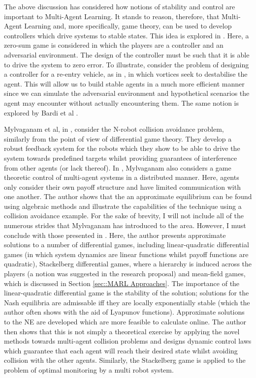 \documentclass[preprint,11pt]{report}
\begin{document}
The above discussion has considered how notions of stability and control are important to
Multi-Agent Learning. It stands to reason, therefore, that Multi-Agent Learning and, more
specifically, game theory, can be used to develop controllers which drive systems to stable states.
This idea is explored in \cite{Marden2018AnnualControl}. Here, a zero-sum game is considered in
which the players are a controller and an adversarial environment. The design of the controller must
be such that it is able to drive the system to zero error. To illustrate, consider the problem of
designing a controller for a re-entry vehicle, as in \cite{Breitner1994ReentryGame}, in which
vortices seek to destabilise the agent. This will allow us to build stable agents in a much more
efficient manner since we can simulate the adversarial environment and hypothetical scenarios the
agent may encounter without actually encountering them. The same notion is explored by Bardi et al
\cite{Bardi1991DifferentialDisturbances}.

 Mylvaganam et al, in \cite{Mylvaganam2017AutonomousApproach}, consider the N-robot collision
 avoidance problem, similarly from the point of view of differential game theory. They develop a
 robust feedback system for the robots which they show to be able to drive the system towards
 predefined targets whilst providing guarantees of interference from other agents (or lack thereof).
 In \cite{MylvaganamASystems}, Mylvaganam also considers a game theoretic control of multi-agent
 systems in a distributed manner. Here, agents only consider their own payoff structure and have
 limited communication with one another. The author shows that the an approximate equilibrium can be
 found using algebraic methods and illustrate the capabilities of the technique using a collision
 avoidance example. For the sake of brevity, I will not include all of the numerous strides that
 Mylvaganam has introduced to the area. However, I must conclude with those presented in
 \cite{Mylvaganam2014}. Here, the author presents approximate solutions to a number of differential
 games, including linear-quadratic differential games (in which system dynamics are linear functions
 whilst payoff functions are quadratic), Stackelberg differential games, where a hierarchy is
 induced across the players (a notion was suggested in the research proposal) and mean-field games,
 which is discussed in Section \ref{sec::MARL Approaches}. The importance of the linear-quadratic
 differential game is the stability of the solution; solutions for the Nash equilibria are
 admissable iff they are locally exponentially stable (which the author often shows with the aid of
 Lyapunov functions). Approximate solutions to the NE are developed which are more feasible to
 calculate online. The author then shows that this is not simply a theoretical exercise by applying
 the novel methods towards multi-agent collision problems and designs dynamic control laws which
 guarantee that each agent will reach their desired state whilst avoiding collision with the other
 agents. Similarly, the Stackelberg game is applied to the problem of optimal monitoring by a multi
 robot system. 
\end{document}
